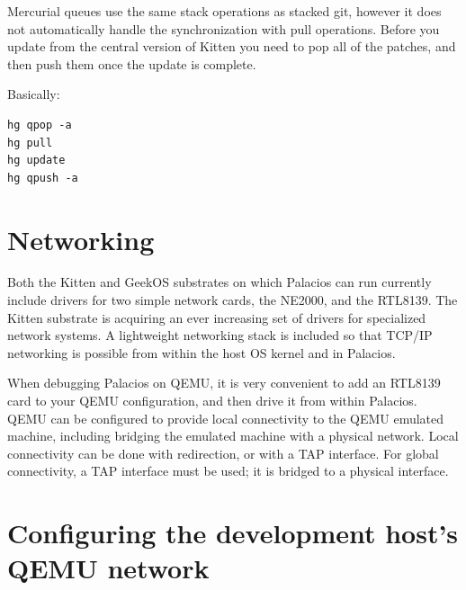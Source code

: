 \documentclass[11pt]{article}
\begin{document}
Mercurial queues use the same stack operations as stacked git, however
it does not automatically handle the synchronization with pull
operations. Before you update from the central version of Kitten you
need to pop all of the patches, and then push them once the update is
complete.

Basically:
\begin{verbatim}
hg qpop -a
hg pull
hg update
hg qpush -a
\end{verbatim}




\section{Networking}

Both the Kitten and GeekOS substrates on which Palacios can run
currently include drivers for two simple network cards, the NE2000,
and the RTL8139.  The Kitten substrate is acquiring an ever increasing
set of drivers for specialized network systems.   A lightweight
networking stack is included so that TCP/IP networking is possible
from within the host OS kernel and in Palacios.  

When debugging Palacios on QEMU, it is very convenient to add an
RTL8139 card to your QEMU configuration, and then drive it from within
Palacios.  QEMU can be configured to provide local connectivity to the
QEMU emulated machine, including bridging the emulated machine with a
physical network.  Local connectivity can be done with redirection, or
with a TAP interface.  For global connectivity, a TAP interface must
be used; it is bridged to a physical interface.

\section{Configuring the development host's QEMU network}
\end{document}
